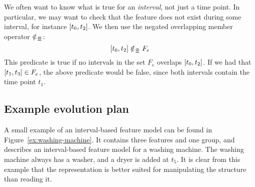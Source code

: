 We often want to know what is true for an \emph{interval}, not just a time point. In particular, we may want to check that the feature does not exist during some interval, for instance $\interval{t_0}{t_2}$. We then use the negated overlapping member operator $\notin_{\leq\!\!\!\!\geq{}}$:
\[
  \interval{t_0}{t_2} \notinnr F_e
\]
This predicate is true if no intervals in the set $F_e$ overlaps $\interval{t_0}{t_2}$. If we had that $\interval{t_1}{t_3} \in F_e$, the above predicate would be false, since both intervals contain the time point $t_1$.

\subsection{Example evolution plan}
A small example of an interval-based feature model can be found in Figure~\vref{ex:washing-machine}. It contains three features and one group, and describes an interval-based feature model for a washing machine. The washing machine always has a washer, and a dryer is added at $t_5$. It is clear from this example that the representation is better suited for manipulating the structure than reading it. 

